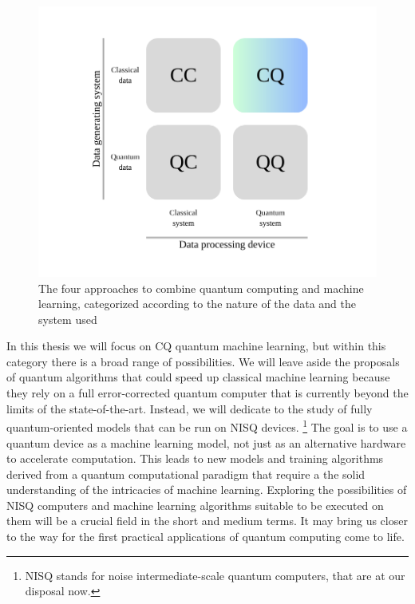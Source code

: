 \begin{figure}
    \centering
    \includegraphics[width=\linewidth]{img/img-ch3/four_intersections_ML-QC.png}
    \caption{The four approaches to combine quantum computing and machine learning, categorized according to the nature of the data and the system used}
    \label{fig:four-intersections}
\end{figure}

In this thesis we will focus on CQ quantum machine learning, but within this category there is a broad range of possibilities. We will leave aside the proposals of  quantum algorithms that could speed up classical machine learning because they rely on a full error-corrected quantum computer that is currently beyond the limits of the state-of-the-art. Instead, we will dedicate to the study of fully quantum-oriented models that can be run on NISQ devices. \footnote{NISQ stands for noise intermediate-scale quantum computers, that are at our disposal now.} The goal is to use a quantum device as a machine learning model, not just as an alternative hardware to accelerate computation. This leads to new models and training algorithms derived from a quantum computational paradigm that require a the solid understanding of the intricacies of machine learning. Exploring the possibilities of NISQ computers and machine learning algorithms suitable to be executed on them will be a crucial field in the short and medium terms. It may bring us closer to the way for the first practical applications of quantum computing come to life. 

